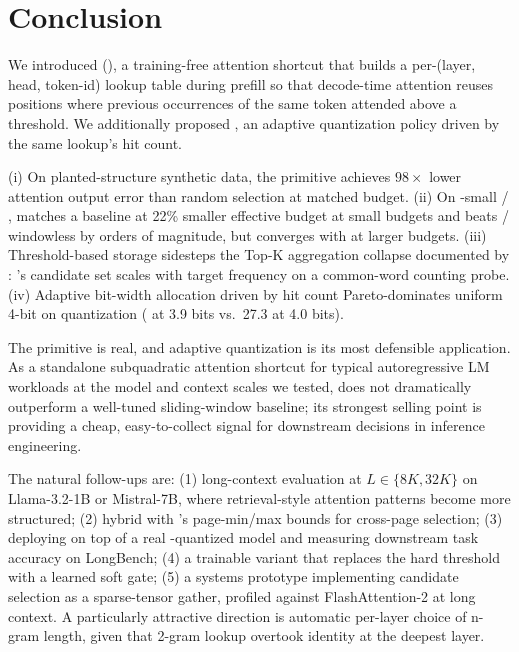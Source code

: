 \section{Conclusion}
\label{sec:conclusion}

We introduced \ours (\hma), a training-free attention shortcut that builds a per-(layer, head, token-id) lookup table during prefill so that decode-time attention reuses positions where previous occurrences of the same token attended above a threshold. We additionally proposed \hmaquant, an adaptive \kvcache quantization policy driven by the same lookup's hit count.

 (i) On planted-structure synthetic data, the primitive achieves $98\times$ lower attention output error than random selection at matched budget. (ii) On \gpttwo-small / \wikitext, \hma matches a \streaming baseline at 22\% smaller effective \kvcache budget at small budgets and beats \randomb / windowless \hto by orders of magnitude, but converges with \streaming at larger budgets. (iii) Threshold-based storage sidesteps the Top-K aggregation collapse documented by \magicpig: \hma's candidate set scales with target frequency on a common-word counting probe. (iv) Adaptive bit-width allocation driven by hit count Pareto-dominates uniform 4-bit on \kvcache quantization ( at 3.9 bits vs.\ 27.3 at 4.0 bits).

 The primitive is real, and adaptive quantization is its most defensible application. As a standalone subquadratic attention shortcut for typical autoregressive LM workloads at the model and context scales we tested, \hma does not dramatically outperform a well-tuned sliding-window baseline; its strongest selling point is providing a cheap, easy-to-collect signal for downstream decisions in inference engineering.

 The natural follow-ups are: (1) long-context evaluation at $L \in \{8K, 32K\}$ on Llama-3.2-1B or Mistral-7B, where retrieval-style attention patterns become more structured; (2) hybrid \hma with \quest's page-min/max bounds for cross-page selection; (3) deploying \hmaquant on top of a real \kivi-quantized model and measuring downstream task accuracy on LongBench; (4) a trainable variant that replaces the hard threshold with a learned soft gate; (5) a systems prototype implementing \hma candidate selection as a sparse-tensor gather, profiled against FlashAttention-2 at long context. A particularly attractive direction is automatic per-layer choice of n-gram length, given that 2-gram lookup overtook identity at the deepest layer.
